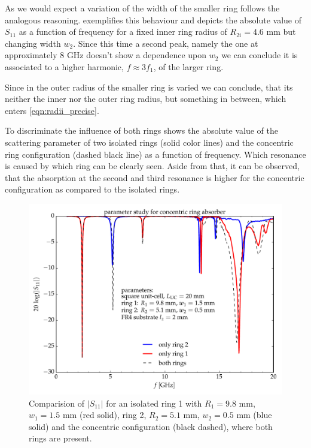 As we would expect a variation of the width of the smaller ring follows the analogous reasoning.  exemplifies this behaviour and depicts the absolute value of $S_{11}$ as a function of frequency for a fixed inner ring radius of $R_{2i}=4.6$ mm but changing width $w_2$. Since this time a second peak, namely the one at approximately $8$ GHz doesn't show a dependence upon $w_2$ we can conclude it is associated to a higher harmonic, $f\approx3f_1$, of the larger ring. 

Since in  the outer radius of the smaller ring is varied we can conclude, that its neither the inner nor the outer ring radius, but something in between, which enters \cref{eqn:radii_precise}.

To discriminate the influence of both rings  shows the absolute value of the scattering parameter of two isolated rings (solid color lines) and the concentric ring configuration (dashed black line) as a function of frequency. Which resonance is caused by which ring can be clearly seen. Aside from that, it can be observed, that the absorption at the second and third resonance is higher for the concentric configuration as compared to the isolated rings.

\begin{figure}
\centering
\includegraphics[width=0.75\linewidth]{./media/wifi_absorber_single_double_rings.pdf}
\caption{Comparision of $|S_{11}|$ for an isolated ring 1 with $R_1=9.8$ mm, $w_1=1.5$ mm (red solid), ring 2, $R_2=5.1$ mm, $w_2=0.5$ mm (blue solid) and the concentric configuration (black dashed), where both rings are present.}
\label{fig:single_double_rings}
\end{figure}

